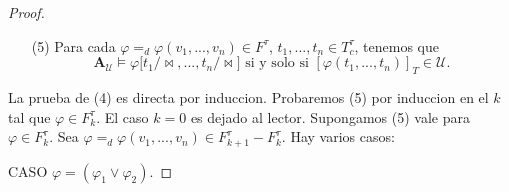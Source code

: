 \begin{proof}
\begin{enumerate}
\item[(5)] Para cada $\varphi =_{d}\varphi (v_{1},...,v_{n})\in F^{\tau }$, $%
t_{1},...,t_{n}\in T_{c}^{\tau }$, tenemos que%
\begin{equation*}
\mathbf{A}_{\mathcal{U}}\models \varphi \lbrack t_{1}/\mathrm{\bowtie }%
,...,t_{n}/\mathrm{\bowtie }]\text{ si y solo si }[\varphi
(t_{1},...,t_{n})]_{T}\in \mathcal{U}.
\end{equation*}
\end{enumerate}

La prueba de (4) es directa por induccion. Probaremos (5) por induccion en
el $k$ tal que $\varphi \in F_{k}^{\tau }$. El caso $k=0$ es dejado al
lector. Supongamos (5) vale para $\varphi \in F_{k}^{\tau }$. Sea $\varphi
=_{d}\varphi (v_{1},...,v_{n})\in F_{k+1}^{\tau }-F_{k}^{\tau }$. Hay varios
casos:

CASO $\varphi =\left( \varphi _{1}\vee \varphi _{2}\right) $.


\end{proof}
